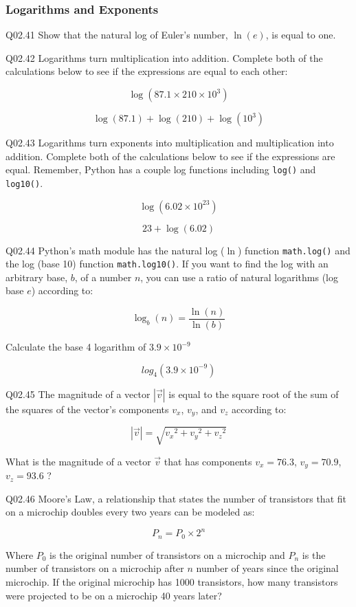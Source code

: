 \documentclass{book}
\newenvironment{problems}{}{}  %
\newcommand{\passthrough}[1]{#1}
\begin{document}
    
        \begin{problems}
        \hypertarget{logarithms-and-exponents}{%
\subsubsection{Logarithms and
Exponents}\label{logarithms-and-exponents}}

Q02.41 Show that the natural log of Euler's number, \(\ln(e)\), is equal
to one.

Q02.42 Logarithms turn multiplication into addition. Complete both of
the calculations below to see if the expressions are equal to each
other:

\[ \log(87.1 \times 210 \times 10^{3}) \]

\[ \log(87.1) + \log(210) + \log(10^{3}) \]

Q02.43 Logarithms turn exponents into multiplication and multiplication
into addition. Complete both of the calculations below to see if the
expressions are equal. Remember, Python has a couple log functions
including \passthrough{\lstinline!log()!} and
\passthrough{\lstinline!log10()!}.

\[ \log(6.02 \times 10^{23}) \]

\[ 23+\log(6.02) \]

Q02.44 Python's math module has the natural log (\(\ln\)) function
\passthrough{\lstinline!math.log()!} and the log (base 10) function
\passthrough{\lstinline!math.log10()!}. If you want to find the log with
an arbitrary base, \(b\), of a number \(n\), you can use a ratio of
natural logarithms (log base \(e\)) according to:

\[ \log_b(n) = \frac{\ln(n)}{\ln(b)} \]

Calculate the base 4 logarithm of \(3.9 \times 10^{-9}\)

\[ log_{4}(3.9 \times 10^{-9}) \]

Q02.45 The magnitude of a vector \(|\vec{v}|\) is equal to the square
root of the sum of the squares of the vector's components \(v_x\),
\(v_y\), and \(v_z\) according to:

\[ |\vec{v}| = \sqrt{{v_x}^2 + {v_y}^2 + {v_z}^2} \]

What is the magnitude of a vector \(\vec{v}\) that has components
\(v_x = 76.3\), \(v_y = 70.9\), \(v_z = 93.6\) ?

Q02.46 Moore's Law, a relationship that states the number of transistors
that fit on a microchip doubles every two years can be modeled as:

\[ P_n = P_0 \times 2^n \]

Where \(P_0\) is the original number of transistors on a microchip and
\(P_n\) is the number of transistors on a microchip after \(n\) number
of years since the original microchip. If the original microchip has
1000 transistors, how many transistors were projected to be on a
microchip 40 years later?
        \end{problems}
\end{document}
